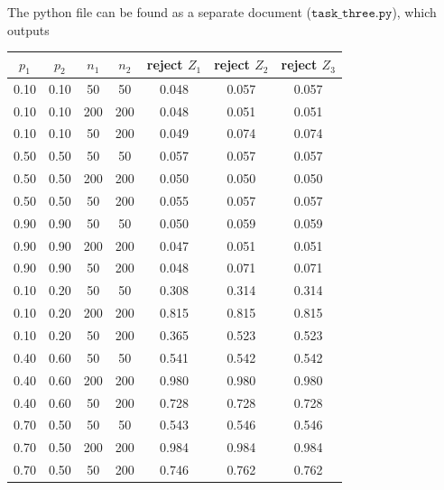 \documentclass[10pt]{article}
\begin{document}
\begin{enumerate}[label=(\roman*)]
    \newpage
    
    \newpage
    
    The python file can be found as a separate document ($\texttt{task\_three.py}$), which outputs
    \begin{center}
        \begin{tabular}{|c|c|c|c|c|c|c|}
            \hline
            $p_1 $ & $p_2 $ & $n_1 $ & $n_2 $ & reject $Z_1 $ & reject $Z_2 $ & reject $Z_3 $\\
            \hline 
            0.10 & 0.10 & 50  & 50  & 0.048 & 0.057 & 0.057 \\
            0.10 & 0.10 & 200 & 200 & 0.048 & 0.051 & 0.051 \\
            0.10 & 0.10 & 50  & 200 & 0.049 & 0.074 & 0.074 \\
            0.50 & 0.50 & 50  & 50  & 0.057 & 0.057 & 0.057 \\
            0.50 & 0.50 & 200 & 200 & 0.050 & 0.050 & 0.050 \\
            0.50 & 0.50 & 50  & 200 & 0.055 & 0.057 & 0.057 \\
            0.90 & 0.90 & 50  & 50  & 0.050 & 0.059 & 0.059 \\
            0.90 & 0.90 & 200 & 200 & 0.047 & 0.051 & 0.051 \\
            0.90 & 0.90 & 50  & 200 & 0.048 & 0.071 & 0.071 \\
            0.10 & 0.20 & 50  & 50  & 0.308 & 0.314 & 0.314 \\
            0.10 & 0.20 & 200 & 200 & 0.815 & 0.815 & 0.815 \\
            0.10 & 0.20 & 50  & 200 & 0.365 & 0.523 & 0.523 \\
            0.40 & 0.60 & 50  & 50  & 0.541 & 0.542 & 0.542 \\
            0.40 & 0.60 & 200 & 200 & 0.980 & 0.980 & 0.980 \\
            0.40 & 0.60 & 50  & 200 & 0.728 & 0.728 & 0.728 \\
            0.70 & 0.50 & 50  & 50  & 0.543 & 0.546 & 0.546 \\
            0.70 & 0.50 & 200 & 200 & 0.984 & 0.984 & 0.984 \\
            0.70 & 0.50 & 50  & 200 & 0.746 & 0.762 & 0.762 \\
            \hline 
        \end{tabular}
    \end{center}
    

\end{enumerate}
\end{document}
